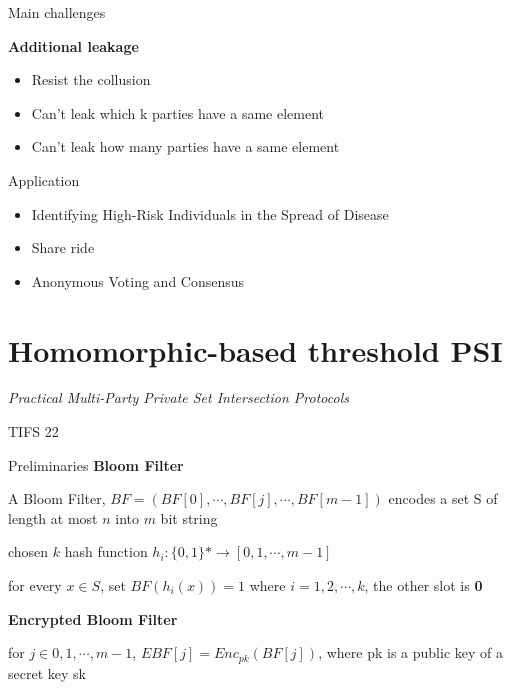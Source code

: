 \begin{frame}{Main challenges}
    
    \textbf{Additional leakage}
    \vspace{0.5cm}
    \begin{itemize}
        \item Resist the collusion
        \item Can't leak which k parties have a same element
        \item Can't leak how many parties have a same element

    \end{itemize}
\end{frame}

\begin{frame}{Application}
    
    \begin{itemize}
        \item Identifying High-Risk Individuals in the Spread of Disease
        \item Share ride
        \item Anonymous Voting and Consensus
    \end{itemize}


\end{frame}






\section{Homomorphic-based threshold PSI}
\begin{frame}
    \centering \textit{Practical Multi-Party Private Set
    Intersection Protocols}

    \vspace{1cm}
    TIFS 22
\end{frame}

\begin{frame}{Preliminaries}
    \textbf{Bloom Filter}

    \vspace{0.5cm}

    A Bloom Filter, $BF = (BF[0],\cdots, BF[ j ], \cdots , BF[m-1])$ encodes a set S of length at most $n$ into $m$ bit
    string

    chosen $k$ hash function $h_i: \{0,1\}* \rightarrow [0,1,\cdots,m-1 ]$

    for every $x \in S$, set $BF(h_i(x))=1$ where $i = 1,2,\cdots,k$, the other slot is \textbf{0}
    
    \vspace{0.5cm}


    \textbf{Encrypted Bloom Filter}

    \vspace{0.5cm}

    for $j \in 0,1,\cdots,m-1 $,
    $EBF [ j] = Enc_{pk}(BF [ j ])$, where pk is a public key
of a secret key sk

\end{frame}


